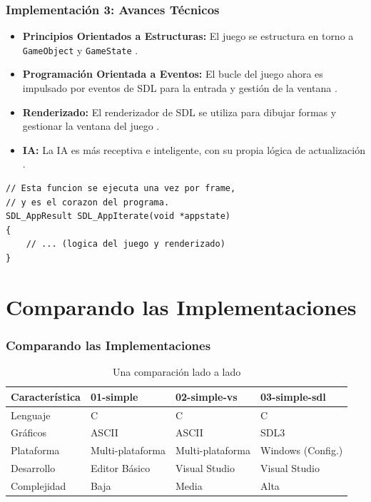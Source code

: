 \documentclass[]{beamer}
\begin{document}
{
\begin{frame}[fragile]
  \frametitle{Implementación 3: Avances Técnicos}
  \begin{itemize}
    \item \textbf{Principios Orientados a Estructuras:} El juego se estructura en torno a \texttt{GameObject} y \texttt{GameState} \cite{pong_sdl_main}.
    \item \textbf{Programación Orientada a Eventos:} El bucle del juego ahora es impulsado por eventos de SDL para la entrada y gestión de la ventana \cite{pong_sdl_main}.
    \item \textbf{Renderizado:} El renderizador de SDL se utiliza para dibujar formas y gestionar la ventana del juego \cite{pong_sdl_main}.
    \item \textbf{IA:} La IA es más receptiva e inteligente, con su propia lógica de actualización \cite{pong_sdl_main}.
  \end{itemize}
  \lstset{style=myC++Style}
  \begin{lstlisting}[]
// Esta funcion se ejecuta una vez por frame,
// y es el corazon del programa.
SDL_AppResult SDL_AppIterate(void *appstate)
{
    // ... (logica del juego y renderizado)
}
  \end{lstlisting}
\end{frame}
}

\section{Comparando las Implementaciones}
\begin{frame}
  \frametitle{Comparando las Implementaciones}
  \tiny{
  \begin{table}
  \centering
  \begin{tabular}{@{}p{2.2cm}p{1.8cm}p{1.8cm}p{2.2cm}@{}}
  \toprule
  \textbf{Característica} & \textbf{01-simple} & \textbf{02-simple-vs} & \textbf{03-simple-sdl} \\
  \midrule
  Lenguaje & C & C & C \\
  Gráficos & ASCII & ASCII & SDL3 \\
  Plataforma & Multi-plataforma & Multi-plataforma & Windows (Config.) \\
  Desarrollo & Editor Básico & Visual Studio & Visual Studio \\
  Complejidad & Baja & Media & Alta \\
  \bottomrule
  \end{tabular}
  \caption{Una comparación lado a lado}
  \end{table}
  }
\end{frame}
\end{document}

